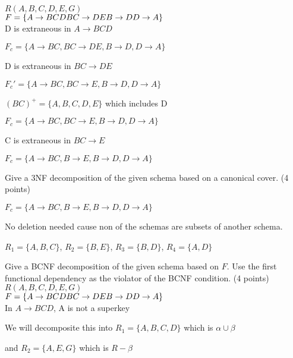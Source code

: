 \documentclass[a4 paper]{article}
\begin{document}
$R(A, B, C, D, E, G)$
\\$F = \{
\\A \rightarrow BCD\\
BC \rightarrow DE\\
B \rightarrow D\\
D \rightarrow A\}$\\

D is extraneous in $A \rightarrow BCD$

$F_c = \{A \rightarrow BC, BC \rightarrow DE, B \rightarrow D, D \rightarrow A\}$

D is extraneous in $BC \rightarrow DE$

$F_c' = \{A \rightarrow BC, BC \rightarrow E, B \rightarrow D, D \rightarrow A\}$

$(BC)^{+} = \{A,B,C,D,E\}$ which includes D

$F_c = \{A \rightarrow BC, BC \rightarrow E, B \rightarrow D, D \rightarrow A\}$

C is extraneous in $BC \rightarrow E$

$F_c = \{A \rightarrow BC, B \rightarrow E, B \rightarrow D, D \rightarrow A\}$


 Give a 3NF decomposition of the given schema based on a canonical cover. \indent (4 points)

$F_c = \{A \rightarrow BC, B \rightarrow E, B \rightarrow D, D \rightarrow A\}$

No deletion needed cause non of the schemas are subsets of another schema.

$R_1 = \{A,B,C\}$, $R_2 = \{B,E\}$, $R_3 = \{B,D\}$, $R_4 = \{A,D\}$



 Give a BCNF decomposition of the given schema based on $F$. Use the first functional dependency as the violator of the BCNF condition. \indent (4 points)\\

$R(A, B, C, D, E, G)$
\\$F = \{
\\A \rightarrow BCD\\
BC \rightarrow DE\\
B \rightarrow D\\
D \rightarrow A\}$\\

In $A \rightarrow BCD$, A is not a superkey

We will decomposite this into $R_1 = \{A,B,C,D\}$ which is $\alpha \cup \beta$ 

and $R_2 = \{A,E,G\}$ which is $R - \beta$
\end{document}
